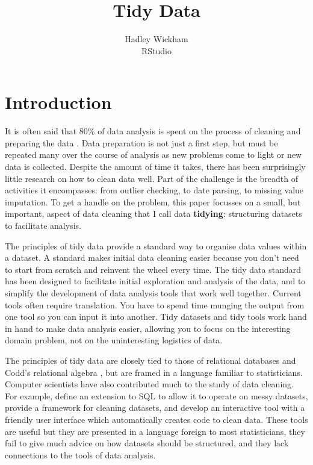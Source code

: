 \documentclass[article]{jss}
\author{Hadley Wickham\\RStudio}
\title{Tidy Data}
\begin{document}
\maketitle

\section{Introduction}

It is often said that 80\% of data analysis is spent on the process of cleaning and preparing the data \citep{dasu:2003}. Data preparation is not just a first step, but must be repeated many over the course of analysis as new problems come to light or new data is collected. Despite the amount of time it takes, there has been surprisingly little research on how to clean data well. Part of the challenge is the breadth of activities it encompasses: from outlier checking, to date parsing, to missing value imputation. To get a handle on the problem, this paper focusses on a small, but important, aspect of data cleaning that I call data \textbf{tidying}: structuring datasets to facilitate analysis.

The principles of tidy data provide a standard way to organise data values within a dataset. A standard makes initial data cleaning easier because you don't need to start from scratch and reinvent the wheel every time. The tidy data standard has been designed to facilitate initial exploration and analysis of the data, and to simplify the development of data analysis tools that work well together. Current tools often require translation. You have to spend time munging the output from one tool so you can input it into another. Tidy datasets and tidy tools work hand in hand to make data analysis easier, allowing you to focus on the interesting domain problem, not on the uninteresting logistics of data.

The principles of tidy data are closely tied to those of relational databases and Codd's relational algebra \citep{codd:1990}, but are framed in a language familiar to statisticians. Computer scientists have also contributed much to the study of data cleaning. For example, \citet{lakshmanan:1996} define an extension to SQL to allow it to operate on messy datasets, \citet{raman:2001} provide a framework for cleaning datasets, and \citet{kandel:2011} develop an interactive tool with a friendly user interface which automatically creates code to clean data. These tools are useful but they are presented in a language foreign to most statisticians, they fail to give much advice on how datasets should be structured, and they lack connections to the tools of data analysis.
\end{document}
